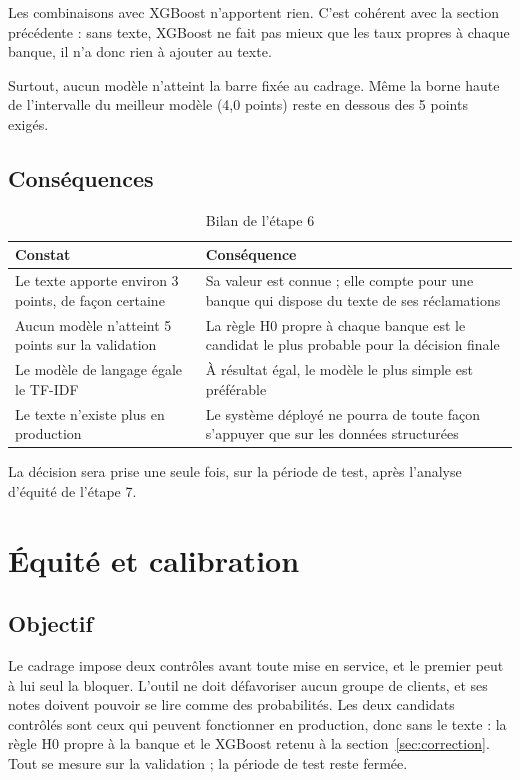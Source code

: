 \documentclass[11pt,a4paper]{article}
\begin{document}
Les combinaisons avec XGBoost n'apportent rien. C'est cohérent avec la section précédente : sans texte, XGBoost ne fait pas mieux que les taux propres à chaque banque, il n'a donc rien à ajouter au texte.

Surtout, aucun modèle n'atteint la barre fixée au cadrage. Même la borne haute de l'intervalle du meilleur modèle (4,0 points) reste en dessous des 5 points exigés.

\subsection{Conséquences}

\begin{table}[H]
\centering\small
\begin{tabularx}{\linewidth}{@{}Y Y@{}}
\toprule
Constat & Conséquence \\
\midrule
Le texte apporte environ 3 points, de façon certaine & Sa valeur est connue ; elle compte pour une banque qui dispose du texte de ses réclamations \\
Aucun modèle n'atteint 5 points sur la validation & La règle H0 propre à chaque banque est le candidat le plus probable pour la décision finale \\
Le modèle de langage égale le TF-IDF & À résultat égal, le modèle le plus simple est préférable \\
Le texte n'existe plus en production & Le système déployé ne pourra de toute façon s'appuyer que sur les données structurées \\
\bottomrule
\end{tabularx}
\caption{Bilan de l'étape 6}
\end{table}

La décision sera prise une seule fois, sur la période de test, après l'analyse d'équité de l'étape 7.

\section{Équité et calibration}
\label{sec:equite}

\subsection{Objectif}

Le cadrage impose deux contrôles avant toute mise en service, et le premier peut à lui seul la bloquer. L'outil ne doit défavoriser aucun groupe de clients, et ses notes doivent pouvoir se lire comme des probabilités. Les deux candidats contrôlés sont ceux qui peuvent fonctionner en production, donc sans le texte : la règle H0 propre à la banque et le XGBoost retenu à la section~\ref{sec:correction}. Tout se mesure sur la validation ; la période de test reste fermée.
\end{document}
